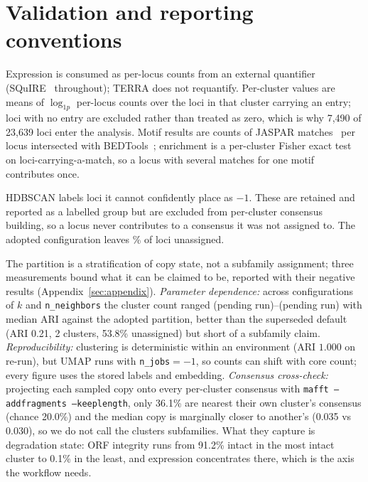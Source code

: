 \documentclass[11pt]{article}
\newcommand{\protoLoci}{23,639}
\newcommand{\protoExprLoci}{7,490}
\newcommand{\protoNoisePctMeasured}{\csNoisePct}
\newcommand{\oldClusters}{2}
\newcommand{\oldNoisePct}{53.8}
\newcommand{\oldMedianARI}{0.21}
\providecommand{\xcAccuracy}{36.1}\providecommand{\xcChance}{20.0}
\providecommand{\xcDivOwn}{0.035}\providecommand{\xcDivOther}{0.030}
\newcommand{\intactRich}{91.2}\newcommand{\intactPoor}{0.1}
\providecommand{\cvClustersMin}{(pending run)}\providecommand{\cvClustersMax}{(pending run)}
\begin{document}
\section{Validation and reporting conventions}
\label{sec:validation}

Expression is consumed as per-locus counts from an external quantifier
(SQuIRE~\citep{yang2019squire} throughout); TERRA does not requantify. Per-cluster values are
means of $\log_{1p}$ per-locus counts over the loci in that cluster carrying an entry; loci with
no entry are excluded rather than treated as zero, which is why \protoExprLoci{} of \protoLoci{}
loci enter the analysis.  Motif results are counts of JASPAR matches~\citep{castromondragon2022jaspar} per locus intersected with
BEDTools~\citep{quinlan2010bedtools}; enrichment is a per-cluster Fisher exact test on
loci-carrying-a-match, so a locus with several matches for one motif contributes once.

HDBSCAN labels loci it cannot confidently place as $-1$. These are
retained and reported as a labelled group but are excluded from per-cluster consensus building,
so a locus never contributes to a consensus it was not assigned to. The adopted configuration
leaves \protoNoisePctMeasured\% of loci unassigned.

The partition is a stratification of copy state, not a subfamily assignment; three measurements
bound what it can be claimed to be, reported with their negative results
(Appendix~\ref{sec:appendix}). \emph{Parameter dependence:} across \cvNConfigs{} configurations
of $k$ and \texttt{n\_neighbors} the cluster count ranged \cvClustersMin{}--\cvClustersMax{}
with median ARI \cvMedianARI{} against the adopted partition, better than the superseded default
(ARI \oldMedianARI{}, \oldClusters{} clusters, \oldNoisePct\% unassigned) but short of a
subfamily claim. \emph{Reproducibility:} clustering is deterministic within an environment (ARI
$1.000$ on re-run), but UMAP runs with \texttt{n\_jobs}$=-1$, so counts can shift with core
count; every figure uses the stored labels and embedding. \emph{Consensus cross-check:}
projecting each sampled copy onto every per-cluster consensus with
\texttt{mafft --addfragments --keeplength}, only \xcAccuracy\% are nearest their own cluster's
consensus (chance \xcChance\%) and the median copy is marginally closer to another's
(\xcDivOwn{} vs \xcDivOther{}), so we do not call the clusters subfamilies. What they capture is
degradation state: ORF integrity runs from \intactRich\% intact in the most intact cluster to
\intactPoor\% in the least, and expression concentrates there, which is the axis the workflow
needs.
\end{document}
